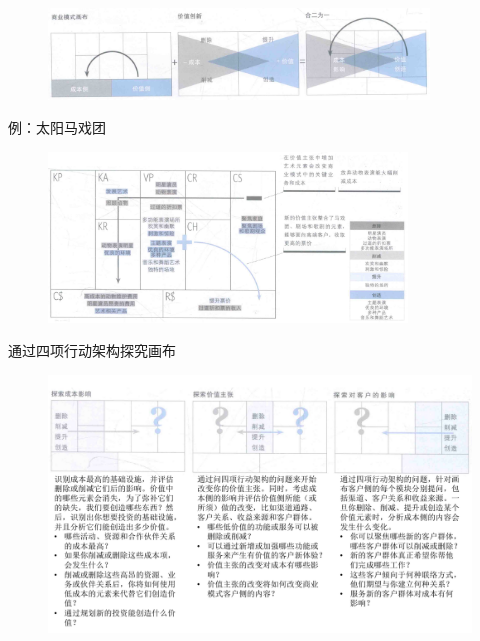 \begin{figure}[H]
	\centering
	\vspace{-0.5em}
	\includegraphics[width=0.9\textwidth]{img/整合蓝海战略框架和商业模式画布.png}
    \vspace{-0.5em}
\end{figure}

例：太阳马戏团
\begin{figure}[H]
	\centering
	\vspace{-0.5em}
	\includegraphics[width=0.85\textwidth]{img/太阳马戏团.png}
    \vspace{-0.5em}
\end{figure}

通过四项行动架构探究画布
\begin{figure}[H]
	\centering
	\vspace{-0.5em}
	\includegraphics[width=\textwidth]{img/通过四项行动架构探究画布.pdf}
    \vspace{-0.5em}
\end{figure}


